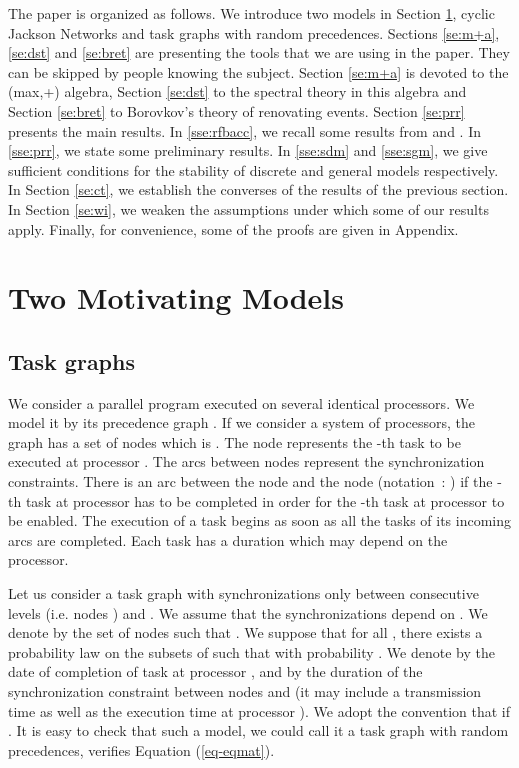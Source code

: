 \documentclass[11pt,titlepage]{article}
\newcommand{\parag}{\medskip\noindent}
\begin{document}
\parag

The paper is organized as follows. We introduce two models
in Section
\ref{se:tmm}, cyclic Jackson
Networks and task graphs with random precedences.  Sections \ref{se:m+a},
\ref{se:dst} and 
\ref{se:bret} are presenting the tools that we are using in the paper. They 
can be skipped by people knowing the subject. Section \ref{se:m+a} is devoted
to the (max,+) algebra, Section \ref{se:dst} to the spectral 
theory in this algebra and Section \ref{se:bret} to Borovkov's theory of
renovating 
events. Section \ref{se:prr} presents the main results. In \ref{sse:rfbacc},
we recall some results from \cite{bacc92} and \cite{cohe}.
In \ref{sse:prr}, we state
some 
preliminary results. In \ref{sse:sdm} and \ref{sse:sgm}, we give 
sufficient 
conditions for the stability of discrete and general models respectively.
In Section \ref{se:ct}, we establish the converses of the results of
the
previous section. In Section \ref{se:wi}, we weaken the assumptions under
which some of our results apply.
Finally, for convenience,
some of the proofs are given in 
Appendix.



\section{Two Motivating Models}
\label{se:tmm}

\subsection{Task graphs}
\label{sse:tg}
We consider a parallel program executed on several identical 
processors. We model it
by its precedence graph . If we consider a system of  processors, 
the graph  has a set of nodes which is . The node  
represents the -th task to be executed at processor . The arcs
between nodes represent 
the synchronization constraints. There
is an arc between
the node  and the node  (notation~: ) 
if the -th task at processor  has to be
completed in order for the -th task at processor  to be enabled.
The execution of a task begins as soon as all the tasks 
of its incoming arcs are
completed. 
Each task has a
duration which may depend on the processor. 


\parag
Let us consider a task graph with synchronizations only between consecutive
levels  (i.e.
nodes ) and . 
We assume that the synchronizations depend on .
We denote by  the set of nodes 
such 
that .
We suppose that for all , there exists a probability law  
on the
subsets of  such that  with
probability . 
We denote by  the
date of completion of task  at processor , and by  the
duration 
of the synchronization constraint between nodes  and  (it
may include a transmission time as well as the execution time at processor
). 
We adopt the convention that 
 if  . 
It is easy to check that such a model,
we could call it a task graph with random precedences, verifies Equation
(\ref{eq-eqmat}). \\
\end{document}
